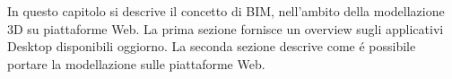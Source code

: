 In questo capitolo si descrive il concetto di BIM,
nell'ambito della modellazione 3D su piattaforme Web. La prima sezione fornisce
un overview sugli applicativi Desktop disponibili oggiorno. La seconda sezione
descrive come \'e possibile portare la modellazione sulle piattaforme Web.
